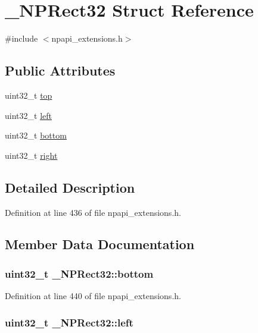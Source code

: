 \hypertarget{struct___n_p_rect32}{
\section{\_\-NPRect32 Struct Reference}
\label{struct___n_p_rect32}
}


{\ttfamily \#include $<$npapi\_\-extensions.h$>$}

\subsection*{Public Attributes}
\begin{DoxyCompactItemize}
\item 
uint32\_\-t \hyperlink{struct___n_p_rect32_aad5fdab264c55fd147ddf01407162cc6}{top}
\item 
uint32\_\-t \hyperlink{struct___n_p_rect32_a230a77d1efc61c110acba3972010a457}{left}
\item 
uint32\_\-t \hyperlink{struct___n_p_rect32_a97d53a860b888ecd6fef2ea8ba7f63d7}{bottom}
\item 
uint32\_\-t \hyperlink{struct___n_p_rect32_add79a8f646aedef1922117689f857020}{right}
\end{DoxyCompactItemize}


\subsection{Detailed Description}


Definition at line 436 of file npapi\_\-extensions.h.



\subsection{Member Data Documentation}
\hypertarget{struct___n_p_rect32_a97d53a860b888ecd6fef2ea8ba7f63d7}{
\subsubsection[{bottom}]{\setlength{\rightskip}{0pt plus 5cm}uint32\_\-t {\bf \_\-NPRect32::bottom}}}
\label{struct___n_p_rect32_a97d53a860b888ecd6fef2ea8ba7f63d7}


Definition at line 440 of file npapi\_\-extensions.h.

\hypertarget{struct___n_p_rect32_a230a77d1efc61c110acba3972010a457}{
\subsubsection[{left}]{\setlength{\rightskip}{0pt plus 5cm}uint32\_\-t {\bf \_\-NPRect32::left}}}
\label{struct___n_p_rect32_a230a77d1efc61c110acba3972010a457}



